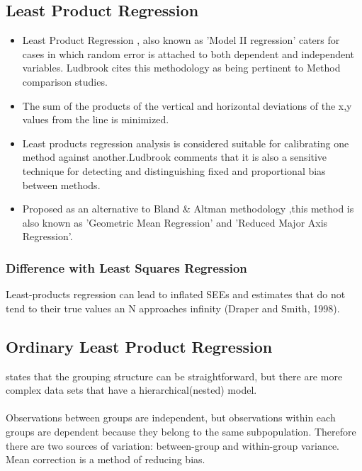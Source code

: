 \documentclass[Chap3amain.tex]{subfiles}
\begin{document}

\subsection{Least Product Regression}

\begin{itemize}
\item Least Product Regression , also known as 'Model II regression'
caters for cases in which random error is attached to both
dependent and independent variables. Ludbrook cites this
methodology as being pertinent to Method comparison studies.

\item 
The sum of the products of the vertical and horizontal deviations
of the x,y values from the line is minimized.

\item 
Least products regression analysis is considered suitable for
calibrating one method against another.Ludbrook comments that it
is also a sensitive technique for detecting and distinguishing
fixed and proportional bias between methods.

\item 
Proposed as an alternative to Bland \& Altman methodology ,this
method is also known as 'Geometric Mean Regression' and 'Reduced
Major Axis Regression'.
\end{itemize}

\subsubsection{Difference with Least Squares Regression}
Least-products regression can lead to inflated SEEs and estimates
that do not tend to their true values an N approaches infinity
(Draper and Smith, 1998).



\subsection{Ordinary Least Product Regression}
\citet{ludbrook97} states that the grouping structure can be
straightforward, but there are more complex data sets that have a
hierarchical(nested) model.
\\
\\
Observations between groups are independent, but observations
within each groups are dependent because they belong to the same
subpopulation. Therefore there are two sources of variation:
between-group and within-group variance.
 \vspace{5 mm} \noindent Mean correction is a method of reducing
bias.
\end{document}
